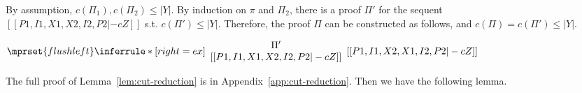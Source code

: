 By assumption, $c(\Pi_1),c(\Pi_2)\leq |Y|$. By induction on $\pi$ and
$\Pi_2$, there is a proof $\Pi'$ for the sequent \\
$[[P1, I1, X1, X2, I2, P2 |-c Z]]$ s.t. $c(\Pi')\leq|Y|$. Therefore, the
proof $\Pi$ can be constructed as follows, and $c(\Pi)=c(\Pi')\leq|Y|$.
\begin{center}
  \scriptsize
  \begin{math}
    $$\mprset{flushleft}
    \inferrule* [right={\tiny ex}] {
      {
        \begin{array}{c}
          \Pi' \\
          {[[P1, I1, X1, X2, I2, P2 |-c Z]]}
        \end{array}
      }
    }{[[P1, I1, X2, X1, I2, P2 |-c Z]]}
  \end{math}
\end{center}
The full proof of Lemma~\ref{lem:cut-reduction} is in
Appendix~\ref{app:cut-reduction}. Then we have the following lemma.

